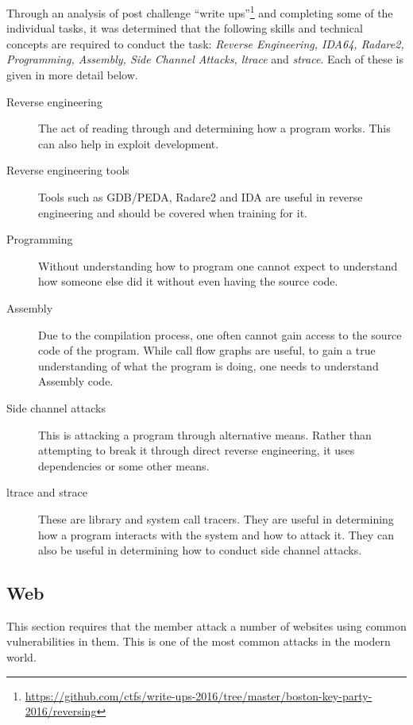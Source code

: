 \documentclass[twoside,a4paper,11pt]{report}
\begin{document}
			Through an analysis of post challenge ``write ups''\footnote{\url{https://github.com/ctfs/write-ups-2016/tree/master/boston-key-party-2016/reversing}}
			and completing some of the individual tasks, 
			it was determined that the following skills and technical concepts are required to conduct the task: 
			\textit{Reverse Engineering, IDA64, Radare2, Programming, Assembly, Side Channel Attacks, ltrace} and \textit{strace}.
			Each of these is given in more detail below. 
			\begin{description}
				\item[Reverse engineering] 
					The act of reading through and determining how a program works. 
					This can also help in exploit development. 
				\item[Reverse engineering tools] 
					Tools such as GDB/PEDA, Radare2 and IDA are useful in reverse engineering and should be covered when training for it. 
				\item[Programming] 
					Without understanding how to program one cannot expect to understand how someone else did it without even having the source code. 
				\item[Assembly] 
					Due to the compilation process, one often cannot gain access to the source code of the program. 
					While call flow graphs are useful, to gain a true understanding of what the program is doing, one needs to understand Assembly code. 
				\item[Side channel attacks] 
					This is attacking a program through alternative means. 
					Rather than attempting to break it through direct reverse engineering, it uses dependencies or some other means. 
				\item[ltrace and strace] 
					These are library and system call tracers. 
					They are useful in determining how a program interacts with the system and how to attack it. 
					They can also be useful in determining how to conduct side channel attacks. 
			\end{description}
		\subsection{Web}
			This section requires that the member attack a number of websites using common vulnerabilities in them. 
			This is one of the most common attacks in the modern world. 
\end{document}
